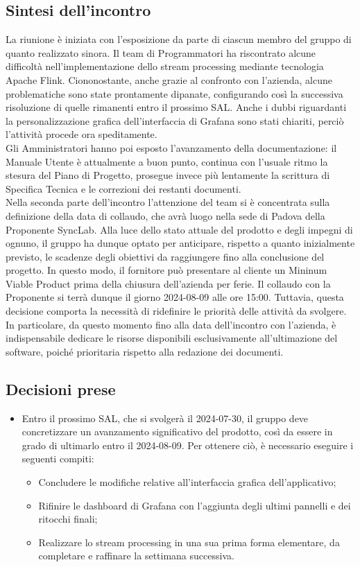 \documentclass[8pt]{article}
\begin{document}
\subsection{Sintesi dell'incontro}
La riunione è iniziata con l'esposizione da parte di ciascun membro del gruppo di quanto realizzato sinora. Il team di Programmatori ha riscontrato alcune difficoltà nell'implementazione dello stream processing mediante tecnologia Apache Flink. Ciononostante, anche grazie al confronto con l'azienda, alcune problematiche sono state prontamente dipanate, configurando così la successiva risoluzione di quelle rimanenti entro il prossimo SAL. Anche i dubbi riguardanti la personalizzazione grafica dell'interfaccia di Grafana sono stati chiariti, perciò l'attività procede ora speditamente. \\ Gli Amministratori hanno poi esposto l'avanzamento della documentazione: il Manuale Utente è attualmente a buon punto, continua con l'usuale ritmo la stesura del Piano di Progetto, prosegue invece più lentamente la scrittura di Specifica Tecnica e le correzioni dei restanti documenti. \\ Nella seconda parte dell'incontro l'attenzione del team si è concentrata sulla definizione della data di collaudo, che avrà luogo nella sede di Padova della Proponente SyncLab. Alla luce dello stato attuale del prodotto e degli impegni di ognuno, il gruppo ha dunque optato per anticipare, rispetto a quanto inizialmente previsto, le scadenze degli obiettivi da raggiungere fino alla conclusione del progetto. In questo modo, il fornitore può presentare al cliente un Mininum Viable Product prima della chiusura dell'azienda per ferie. Il collaudo con la Proponente si terrà dunque il giorno 2024-08-09 alle ore 15:00. Tuttavia, questa decisione comporta la necessità di ridefinire le priorità delle attività da svolgere. In particolare, da questo momento fino alla data dell'incontro con l'azienda, è indispensabile dedicare le risorse disponibili esclusivamente all'ultimazione del software, poiché prioritaria rispetto alla redazione dei documenti.

\subsection{Decisioni prese}
\begin{itemize}
\setlength\itemsep{0em}
    \item Entro il prossimo SAL, che si svolgerà il 2024-07-30, il gruppo deve concretizzare un avanzamento significativo del prodotto, così da essere in grado di ultimarlo entro il 2024-08-09. Per ottenere ciò, è necessario eseguire i seguenti compiti:
    \begin{itemize}
        \item Concludere le modifiche relative all'interfaccia grafica dell'applicativo;
        \item Rifinire le dashboard di Grafana con l'aggiunta degli ultimi pannelli e dei ritocchi finali;
        \item Realizzare lo stream processing in una sua prima forma elementare, da completare e raffinare la settimana successiva.
    \end{itemize}  
\end{itemize}
\newpage
\end{document}
